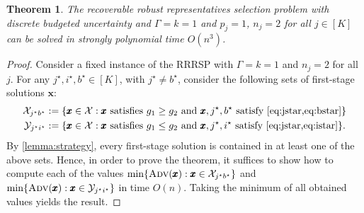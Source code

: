 \documentclass[a4paper,11pt,abstracton]{scrartcl}
\newtheorem{theorem}{Theorem}%
\theoremstyle{definition}
\theoremstyle{remark}
\newcommand{\X}{\mathcal{X}}
\begin{document}
\begin{theorem}\label{thm:easy_case_RRRS}
The recoverable robust representatives selection problem with discrete budgeted uncertainty and $\Gamma = k = 1$ and $p_j=1$, $n_j = 2$ for all $j\in[K]$ can be solved in strongly polynomial time $O(n^3)$.
\end{theorem}
\begin{proof}
Consider a fixed instance of the RRRSP with $\Gamma = k = 1$ and $n_j = 2$ for all $j$. For any $j^\star, i^\star, b^\star \in [K]$, with $j^\star \neq b^\star$, consider the following sets of first-stage solutions $\pmb x$: 
\begin{align*} \X_{j^\star b^\star} &:= \{ \pmb x\in \X : \pmb x \text{ satisfies } g_1 \geq g_2 \text{ and }\pmb x, j^\star, b^\star \text{ satisfy \cref{eq:jstar,eq:bstar}}\}\\
\mathcal{Y}_{j^\star i^\star} &:= \{ \pmb x\in \X : \pmb x \text{ satisfies } g_1 \leq g_2 \text{ and } \pmb x, j^\star, i^\star \text{ satisfy \cref{eq:jstar,eq:istar}}\}.
\end{align*}
By \cref{lemma:strategy}, every first-stage solution is contained in at least one of the above sets. Hence, in order to prove the theorem, it suffices to show how to compute each of the values
$\min\{\textsc{Adv}(\pmb x) : \pmb x  \in \X_{j^\star b^\star}\}$ and $\min\{\textsc{Adv}(\pmb x) : \pmb x  \in \mathcal{Y}_{j^\star i^\star}\}$ in time $O(n)$. Taking the minimum of all obtained values yields the result.


\end{proof}
\end{document}
